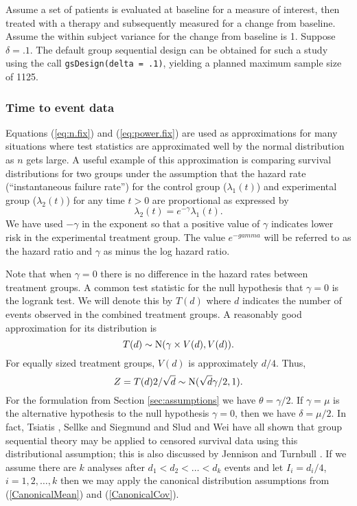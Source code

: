 Assume a set of patients is evaluated at baseline for a measure of interest, then treated with a therapy and subsequently measured for a change from baseline. Assume the within subject variance for the change from baseline is 1.
Suppose $\delta=.1$.
The default group sequential design can be obtained for such a study using the call \texttt{gsDesign(delta = .1)}, yielding a planned maximum sample size of 1125.

\subsubsection{Time to event data\label{sec:TTE}}
Equations (\ref{eq:n.fix}) and (\ref{eq:power.fix}) are used as approximations for many situations where test statistics are approximated well by the normal distribution as $n$ gets large. 
A useful example of this approximation is comparing survival distributions for two groups under the assumption that the hazard rate (``instantaneous failure rate'') for the control group ($\lambda_1(t)$) and experimental group ($\lambda_2(t)$) for any time $t>0$ are proportional as expressed by
\begin{equation}
\lambda_2(t)=e^{-\gamma}\lambda_1(t).
\end{equation} 
We have used $-\gamma$ in the exponent so that a positive value of $\gamma$ indicates lower risk in the experimental treatment group. 
The value $e^{-gamma}$ will be referred to as the hazard ratio and $\gamma$ as minus the log hazard ratio.

Note that when $\gamma=0$ there is no difference in the hazard rates between treatment groups.
A common test statistic for the null hypothesis that $\gamma=0$ is the logrank test.
We will denote this by $T(d)$ where $d$ indicates the number of events observed in the combined treatment groups.
A reasonably good approximation for its distribution is 
\begin{equation}
T(d)\sim\hbox{N}(\gamma\times V(d),V(d)).
\end{equation}
For equally sized treatment groups, $V(d)$ is approximately $d/4$.
Thus, 
\begin{equation}
Z=T(d)2/\sqrt{d}\sim\hbox{N}(\sqrt{d}\gamma/2,1).
\end{equation}
For the formulation from Section \ref{sec:assumptions} we have $\theta=\gamma/2$. 
If $\gamma=\mu$ is the alternative hypothesis to the null hypothesis $\gamma=0$, then we have $\delta=\mu/2$.
In fact, Tsiatis \cite{Tsiatis}, Sellke and Siegmund \cite{SellkeSiegmund} and Slud and Wei \cite{SludWei} have all shown that group sequential theory may be applied to censored survival data using this distributional assumption; this is also discussed by Jennison and Turnbull \cite{JTBook}. 
If we assume there are $k$ analyses after $d_1<d_2<\ldots<d_k$ events and let $I_i=d_i/4$,  $i=1,2,\ldots,k$ then we may apply the canonical distribution assumptions from (\ref{CanonicalMean}) and (\ref{CanonicalCov}).

